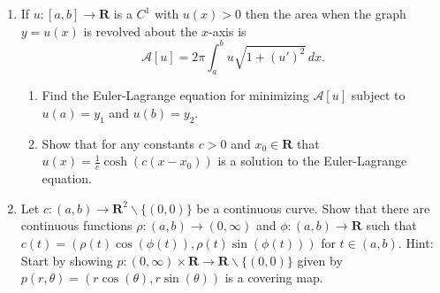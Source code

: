 \documentclass[11pt]{amsart}
\renewcommand{\(}{\left(}
\renewcommand{\)}{\right)}
\renewcommand{\[}{\left[}
\renewcommand{\]}{\right]}
\theoremstyle{definition}
\theoremstyle{remark}
\newcommand{\R}{{\mathbf R}}   %
\newcommand{\cn}{\colon}
\renewcommand{\setminus}{\smallsetminus}
\begin{document}
\begin{enumerate}
\item If $u\cn [a,b]\to\R$ is a $C^1$ with $u(x)>0$ then the area when the 
graph $y=u(x)$ is revolved about the $x$-axis is
$$
\mathcal A[u] =2\pi\int_a^bu\sqrt{1+(u')^2}\,dx.
$$
   \begin{enumerate}
   \item Find the Euler-Lagrange equation for minimizing $\mathcal A [u]$ subject
   to $u(a)=y_1$ and $u(b)=y_2$.  
   \item Show that for any constants $c>0$ and $x_0\in \R$ that 
    $u(x)=\frac1c\cosh(c(x-x_0))$ is a solution to the Euler-Lagrange 
   equation.
   \end{enumerate}

\item Let $c\cn (a,b)\to \R^2\setminus \{ (0,0)\}$ be a continuous curve.  Show that 
there are continuous functions $\rho\cn (a,b)\to (0,\infty)$ and $\phi\cn (a,b)\to \R$ such 
that $c(t)=(\rho(t)\cos(\phi(t)),\rho(t)\sin(\phi(t)))$ for $t\in (a,b)$. {\sc Hint:} Start by showing 
$p\cn (0,\infty)\times \R\to \R\setminus \{(0,0)\}$ given by 
$p(r,\theta)=(r\cos(\theta),r\sin(\theta))$ is a covering map.


\end{enumerate}

 
\end{document}
